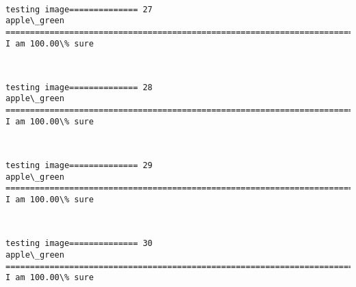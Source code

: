 \documentclass[11pt]{article}
\begin{document}
    \begin{center}
    \end{center}
    { \hspace*{\fill} \\}
    
    \begin{Verbatim}[commandchars=\\\{\}]
testing image============== 27
apple\_green
============================================================================
I am 100.00\% sure

    \end{Verbatim}

    \begin{center}
    \end{center}
    { \hspace*{\fill} \\}
    
    \begin{Verbatim}[commandchars=\\\{\}]
testing image============== 28
apple\_green
============================================================================
I am 100.00\% sure

    \end{Verbatim}

    \begin{center}
    \end{center}
    { \hspace*{\fill} \\}
    
    \begin{Verbatim}[commandchars=\\\{\}]
testing image============== 29
apple\_green
============================================================================
I am 100.00\% sure

    \end{Verbatim}

    \begin{center}
    \end{center}
    { \hspace*{\fill} \\}
    
    \begin{Verbatim}[commandchars=\\\{\}]
testing image============== 30
apple\_green
============================================================================
I am 100.00\% sure

    \end{Verbatim}
\end{document}
